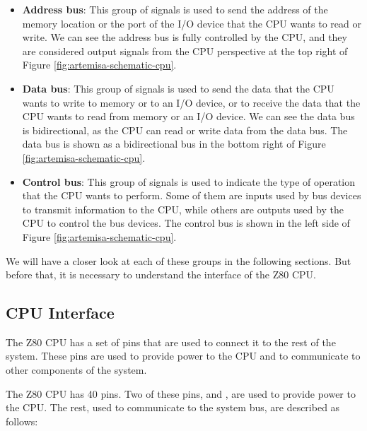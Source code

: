 \begin{itemize}
    \item {\bf Address bus}: This group of signals is used to send the address of the memory
    location or the port of the I/O device that the CPU wants to read or write. We can see the
    address bus is fully controlled by the CPU, and they are considered output signals from the CPU
    perspective at the top right of Figure \ref{fig:artemisa-schematic-cpu}.
    \item {\bf Data bus}: This group of signals is used to send the data that the CPU wants to write
    to memory or to an I/O device, or to receive the data that the CPU wants to read from memory or
    an I/O device. We can see the data bus is bidirectional, as the CPU can read or write data from
    the data bus. The data bus is shown as a bidirectional bus in the bottom right of Figure
    \ref{fig:artemisa-schematic-cpu}.
    \item {\bf Control bus}: This group of signals is used to indicate the type of operation that
    the CPU wants to perform. Some of them are inputs used by bus devices to transmit information to
    the CPU, while others are outputs used by the CPU to control the bus devices. The control bus is
    shown in the left side of Figure \ref{fig:artemisa-schematic-cpu}.
\end{itemize}

We will have a closer look at each of these groups in the following sections. But before that, it is
necessary to understand the interface of the Z80 CPU.

\subsection{CPU Interface}

The Z80 CPU has a set of pins that are used to connect it to the rest of the system. These pins are
used to provide power to the CPU and to communicate to other components of the system.

The Z80 CPU has 40 pins. Two of these pins,  and , are used to provide power to
the CPU. The rest, used to communicate to the system bus, are described as follows:

